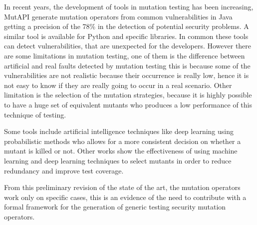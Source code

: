 In recent years, the development of tools in mutation testing has been increasing, MutAPI\cite{Wen2019} generate mutation operators from common vulnerabilities in Java getting a precision of the 78\% in the detection of potential security problems. A similar tool is available for Python\cite{Zhang2020} and specific libraries\cite{Kechagia2019}. In common these tools can detect vulnerabilities, that are unexpected for the developers. However there are some limitations in mutation testing, one of them is the difference between artificial and real faults detected by mutation testing\cite{Ojdanic2023} this is because some of the vulnerabilities are not realistic because their occurrence is really low, hence it is not easy to know if they are really going to occur in a real scenario. Other limitation is the selection of the mutation strategies, because it is highly possible to have a huge set of equivalent mutants who produces a low performance of this technique of testing\cite{Pitts2023}.

Some tools include artificial intelligence techniques like deep learning\cite{Tambon2023} using probabilistic methods who allows for a more consistent decision on whether a mutant is killed or not. Other works \cite{Naeem2019, Mao2019,Tian2022} show the effectiveness of using machine learning and deep learning techniques to select mutants in order to reduce redundancy and improve test coverage.

From this preliminary revision of the state of the art, the mutation operators work only on specific cases, this is an evidence of the need to contribute with a formal framework for the generation of generic testing security mutation operators.



